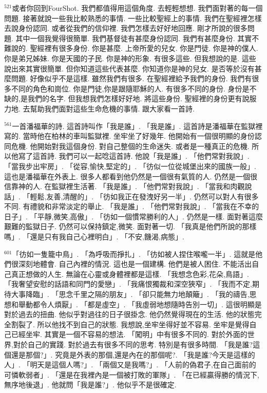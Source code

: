 \documentclass{book}
\begin{document}
$^{521}$或者你回到FourShot.
我們都值得用這個角度.
去輕輕想想.
我們面對著的每一個問題.
接著就說一些我比較熟悉的事情.
一些比較聖經上的事情.
我們在聖經裡怎樣去說身份認同.
或者從我們的信仰裡.
我們怎樣去好好地回應.
剛才所說的很多問題.
其中一個我覺得很簡單.
我們基督徒有甚麼身份認同.
我們有甚麼身份.
其實不難說的.
聖經裡有很多身份.
你是甚麼.
上帝所愛的兒女.
你是門徒.
你是神的僕人.
你是弟兄姊妹.
你是天國的子民.
你是神的形象.
有很多這些.
但我想說的是.
這些說出來其實很簡單.
但你知道這些代表甚麼.
你知道你是神的兒女.
是否等於沒有甚麼問題.
好像似乎不是這樣.
雖然我們有很多.
在聖經裡給予我們的身份.
我們有很多不同的角色和崗位.
你是門徒,你是跟隨耶穌的人.
有很多不同的身份.
身份是不缺的,是我們的名字.
但我想我們怎樣好好地.
將這些身份.
聖經裡的身份更有說服力地.
去幫助我們面對這些生命危機的事情.
跟大家看一首詩.

$^{561}$一首潘福華的詩.
這首詩叫作「我是誰」.
「我是誰」.
這首詩是潘福華在監獄裡寫的.
當時他在柏林的車叫監獄裡.
坐牢坐了好幾年.
他開始有一個很明顯的身份認同危機.
他開始對我這個身份.
對自己整個的生命迷失.
或者是一種真正的危機.
所以他寫了這首詩.
我們可以一起唸這首詩.
他說「我是誰」.
「他們常對我說」.
「當我步出牢房」.
「從容,愉快,堅定的」.
「彷似一位從城堡出來的國族一般」.
這也是潘福華在外表上.
很多人都看到他仍然是一個很有氣質的人.
仍然是一個很信靠神的人.
在監獄裡生活著.
「我是誰」.
「他們常對我說」.
「當我和肉觀說話」.
「輕鬆,友善,清醒的」.
「彷如我正在發洩好另一半」.
仍然可以對人有很多不同.
有禮貌和非常淡定的舉止.
「我是誰」.
「他們常對我說」.
「當我在不幸的日子」.
「平靜,微笑,高傲」.
「彷如一個慣常勝利的人」.
仍然是一樣.
面對著這麼艱難的監獄日子.
仍然可以保持鎮定,微笑.
面對著一切.
「我真是他們所說的那樣嗎」.
「還是只有我自己心裡明白」.
「不安,饑渴,病態」.

$^{601}$「彷如一隻籠中鳥」.
「為呼吸而掙扎」.
「彷如被人捏住喉嚨一半」.
這就是他們很深刻地體會.
自己內裡的情況.
這也是一個建構.
他們是被人困住.
不能活出自己真正想做的人生.
無論在心靈或身體裡都是這樣.
「我想念色彩,花朵,鳥語」.
「我奢望安慰的話語和同門的愛戀」.
「我痛恨獨裁和深空狹窄」.
「我而不定,期待大事降臨」.
「思念千里之隔的朋友」.
「卻只能無力地顛簸」.
「我的禱告,思想和舉動都令人煩厭」.
「都是虛空」.
「我虛弱地想隨時告別一切」.
這很明顯是對於過去的扭曲.
他似乎對過往的日子很掛念.
他仍然覺得現在的生活.
他的狀態完全割裂了.
所以他找不到自己的狀態.
我想說,坐牢坐得好並不容易.
坐牢是覺得自己已經坐牢.
其實是一個不容易的想法.
「闖明」中有很多不同的.
對於外面的世界,對於自己的實踐.
對於過去有很多不同的思考.
特別是有很多時間.
「我是誰?這個還是那個?」.
究竟是外表的那個,還是內在的那個呢?.
「我是誰?今天是這樣的人」.
「明天是這個人嗎?」.
「兩個又是我嗎?」.
「人前的偽君子,在自己面前的可憐軟弱者」.
「還是在我裡內是一個被打敗的軍隊」.
「在已經贏得勝的情況下,無序地後退」.
他就問「我是誰?」.
他似乎不是很確定.
\end{document}
